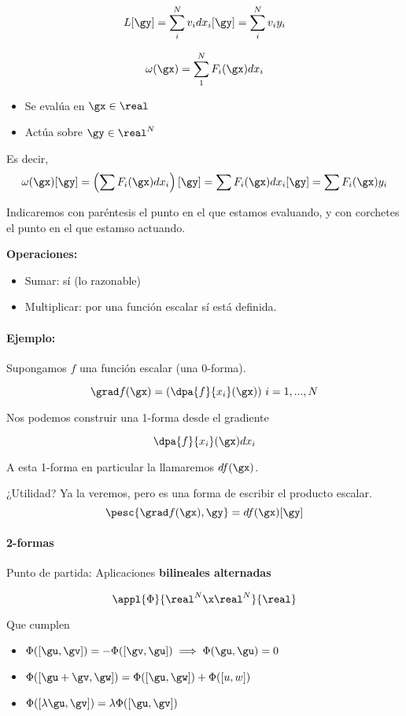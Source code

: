 \[L[\gy] = \sum_i^N v_idx_i[\gy] = \sum_i^N v_iy_i\]

\begin{defn}[1-forma]
\[\omega(\gx)= \sum_1^N F_i(\gx) dx_i\]

\begin{itemize}
\item Se evalúa en $\gx\in\real$
\item Actúa sobre $\gy\in\real^N$ 
\end{itemize}

Es decir, \[\omega(\gx)[\gy] = \left(\sum F_i(\gx)dx_i\right)[\gy] = \sum F_i(\gx)dx_i[\gy] = \sum F_i(\gx)y_i\]
\end{defn}

Indicaremos con paréntesis el punto en el que estamos evaluando, y con corchetes el punto en el que estamso actuando.

\textbf{Operaciones:}
\begin{itemize}
\item Sumar: sí (lo razonable)
\item Multiplicar: por una función escalar sí está definida.
\end{itemize}


\paragraph{Ejemplo:}

Supongamos $f$ una función escalar (una 0-forma).

\[\grad f(\gx) = \left( \dpa{f}{x_i}(\gx)\right)\, i=1,...,N\]

Nos podemos construir una 1-forma desde el gradiente

\[\dpa{f}{x_i}(\gx)dx_i \]

A esta 1-forma en particular la llamaremos $df(\gx)$.

¿Utilidad? Ya la veremos, pero es una forma de escribir el producto escalar.
\[\pesc{\grad f(\gx),\gy} = df(\gx)[\gy]\]


\paragraph{2-formas}

Punto de partida: Aplicaciones \textbf{bilineales alternadas}

\[\appl{\Phi}{\real^N\x\real^N}{\real}\]

Que cumplen \begin{itemize}
\item $\Phi([\gu,\gv]) = - \Phi([\gv,\gu]) \implies \Phi(\gu,\gu)=0$
\item $ \Phi([\gu+\gv,\gw]) = \Phi ([\gu,\gw]) + \Phi([u,w])$
\item$\Phi([\lambda \gu,\gv]) = \lambda \Phi([\gu,\gv])$
\end{itemize}


